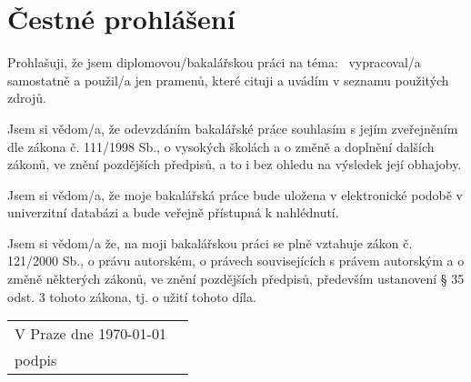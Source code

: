 \vspace*{\fill}
\section*{Čestné prohlášení}
Prohlašuji, že jsem diplomovou/bakalářskou práci na téma: \inserttitle \ vypracoval/a samostatně a použil/a jen pramenů, které cituji a uvádím v seznamu použitých zdrojů.

Jsem si vědom/a, že odevzdáním bakalářské práce souhlasím s jejím zveřejněním dle zákona č. 111/1998 Sb., o vysokých školách a o změně a doplnění dalších zákonů, ve znění pozdějších předpisů, a to i bez ohledu na výsledek její obhajoby.

Jsem si vědom/a, že moje bakalářská práce bude uložena v elektronické podobě v univerzitní databázi a bude veřejně přístupná k nahlédnutí.

Jsem si vědom/a že, na moji bakalářskou práci se plně vztahuje zákon č. 121/2000 Sb., o právu autorském, o právech souvisejících s právem autorským a o změně některých zákonů, ve znění pozdějších předpisů, především ustanovení § 35 odst. 3 tohoto zákona, tj. o užití tohoto díla.

\qquad

\setlength{\dashlinedash}{1pt}
\setlength{\dashlinegap}{1pt}
\setlength{\arrayrulewidth}{1pt}

\noindent
\begin{tabularx}{\textwidth}{X r}
V Praze dne \today &
\begin{tabular}[b]{@{} p{6cm} @{}}
\\
\hdashline
\centering
podpis
\end{tabular}
\\
\end{tabularx}
